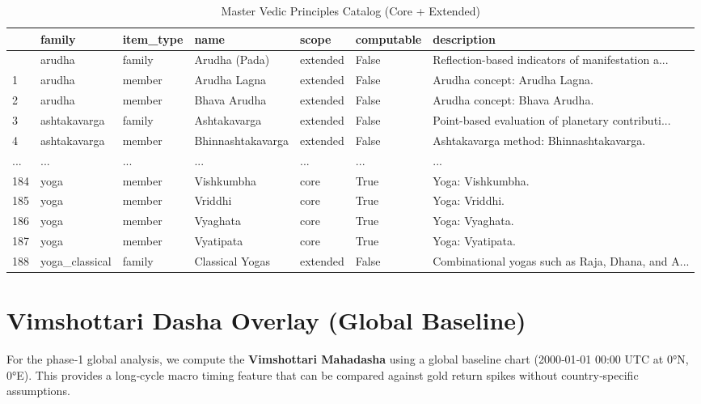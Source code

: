 \documentclass[
  11pt,
  a4paper,
  oneside,
  openany]{article}
\begin{document}
\begin{longtable}[]{@{}lllllll@{}}

\caption{\label{tbl-gold-vedic-master}Master Vedic Principles Catalog
(Core + Extended)}

\tabularnewline

\toprule\noalign{}
& family & item\_type & name & scope & computable & description \\
\midrule\noalign{}
\endhead
\bottomrule\noalign{}
\endlastfoot
0 & arudha & family & Arudha (Pada) & extended & False &
Reflection-based indicators of manifestation a... \\
1 & arudha & member & Arudha Lagna & extended & False & Arudha concept:
Arudha Lagna. \\
2 & arudha & member & Bhava Arudha & extended & False & Arudha concept:
Bhava Arudha. \\
3 & ashtakavarga & family & Ashtakavarga & extended & False &
Point-based evaluation of planetary contributi... \\
4 & ashtakavarga & member & Bhinnashtakavarga & extended & False &
Ashtakavarga method: Bhinnashtakavarga. \\
... & ... & ... & ... & ... & ... & ... \\
184 & yoga & member & Vishkumbha & core & True & Yoga: Vishkumbha. \\
185 & yoga & member & Vriddhi & core & True & Yoga: Vriddhi. \\
186 & yoga & member & Vyaghata & core & True & Yoga: Vyaghata. \\
187 & yoga & member & Vyatipata & core & True & Yoga: Vyatipata. \\
188 & yoga\_classical & family & Classical Yogas & extended & False &
Combinational yogas such as Raja, Dhana, and A... \\

\end{longtable}

\section{Vimshottari Dasha Overlay (Global
Baseline)}\label{vimshottari-dasha-overlay-global-baseline}

For the phase‑1 global analysis, we compute the \textbf{Vimshottari
Mahadasha} using a global baseline chart (2000‑01‑01 00:00 UTC at 0°N,
0°E). This provides a long‑cycle macro timing feature that can be
compared against gold return spikes without country‑specific
assumptions.
\end{document}
